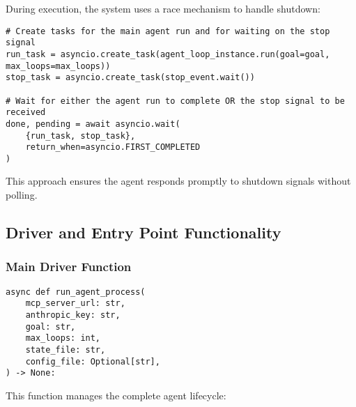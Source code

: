 \documentclass[12pt,a4paper]{article}
\begin{document}
During execution, the system uses a race mechanism to handle shutdown:
\begin{pageablecode}
\begin{verbatim}
# Create tasks for the main agent run and for waiting on the stop signal
run_task = asyncio.create_task(agent_loop_instance.run(goal=goal, max_loops=max_loops))
stop_task = asyncio.create_task(stop_event.wait())

# Wait for either the agent run to complete OR the stop signal to be received
done, pending = await asyncio.wait(
    {run_task, stop_task},
    return_when=asyncio.FIRST_COMPLETED
)
\end{verbatim}
\end{pageablecode}
This approach ensures the agent responds promptly to shutdown signals without polling.

\subsection*{Driver and Entry Point Functionality}

\subsubsection*{Main Driver Function}
\begin{pageablecode}
\begin{verbatim}
async def run_agent_process(
    mcp_server_url: str,
    anthropic_key: str,
    goal: str,
    max_loops: int,
    state_file: str,
    config_file: Optional[str],
) -> None:
\end{verbatim}
\end{pageablecode}
This function manages the complete agent lifecycle:
\end{document}
